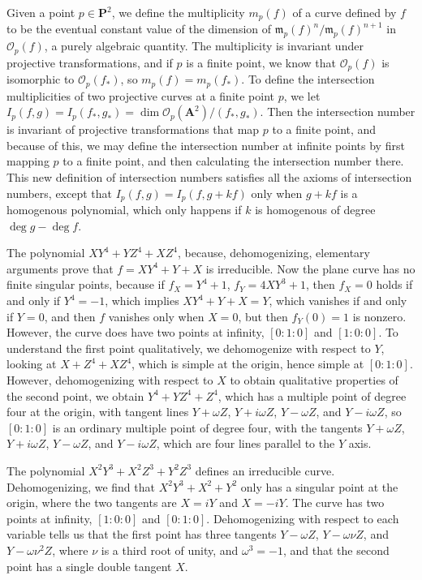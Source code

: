 Given a point $p \in \mathbf{P}^2$, we define the multiplicity $m_p(f)$ of a curve defined by $f$ to be the eventual constant value of the dimension of $\mathfrak{m}_p(f)^n/\mathfrak{m}_p(f)^{n+1}$ in $\mathcal{O}_p(f)$, a purely algebraic quantity. The multiplicity is invariant under projective transformations, and if $p$ is a finite point, we know that $\mathcal{O}_p(f)$ is isomorphic to $\mathcal{O}_p(f_*)$, so $m_p(f) = m_p(f_*)$. To define the intersection multiplicities of two projective curves at a finite point $p$, we let $I_p(f,g) = I_p(f_*,g_*) = \dim \mathcal{O}_p(\mathbf{A}^2)/(f_*,g_*)$. Then the intersection number is invariant of projective transformations that map $p$ to a finite point, and because of this, we may define the intersection number at infinite points by first mapping $p$ to a finite point, and then calculating the intersection number there. This new definition of intersection numbers satisfies all the axioms of intersection numbers, except that $I_p(f,g) = I_p(f,g + kf)$ only when $g + kf$ is a homogenous polynomial, which only happens if $k$ is homogenous of degree $\deg g - \deg f$.

\begin{example}
    The polynomial $XY^4 + YZ^4 + XZ^4$, because, dehomogenizing, elementary arguments prove that $f = XY^4 + Y + X$ is irreducible. Now the plane curve has no finite singular points, because if $f_X = Y^4 + 1$, $f_Y = 4XY^3 + 1$, then $f_X = 0$ holds if and only if $Y^4 = -1$, which implies $XY^4 + Y + X = Y$, which vanishes if and only if $Y = 0$, and then $f$ vanishes only when $X = 0$, but then $f_Y(0) = 1$ is nonzero. However, the curve does have two points at infinity, $[0:1:0]$ and $[1:0:0]$. To understand the first point qualitatively, we dehomogenize with respect to $Y$, looking at $X + Z^4 + XZ^4$, which is simple at the origin, hence simple at $[0:1:0]$. However, dehomogenizing with respect to $X$ to obtain qualitative properties of the second point, we obtain $Y^4 + YZ^4 + Z^4$, which has a multiple point of degree four at the origin, with tangent lines $Y + \omega Z$, $Y + i \omega Z$, $Y - \omega Z$, and $Y - i \omega Z$, so $[0:1:0]$ is an ordinary multiple point of degree four, with the tangents $Y + \omega Z$, $Y + i \omega Z$, $Y - \omega Z$, and $Y - i \omega Z$, which are four lines parallel to the $Y$ axis.
\end{example}

\begin{example}
    The polynomial $X^2Y^3 + X^2Z^3 + Y^2Z^3$ defines an irreducible curve. Dehomogenizing, we find that $X^2Y^3 + X^2 + Y^2$ only has a singular point at the origin, where the two tangents are $X = iY$ and $X = -iY$. The curve has two points at infinity, $[1:0:0]$ and $[0:1:0]$. Dehomogenizing with respect to each variable tells us that the first point has three tangents $Y - \omega Z$, $Y - \omega \nu Z$, and $Y - \omega \nu^2 Z$, where $\nu$ is a third root of unity, and $\omega^3 = -1$, and that the second point has a single double tangent $X$.
\end{example}

